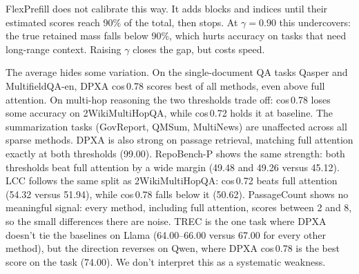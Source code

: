 FlexPrefill does not calibrate this way. It adds blocks and indices until their estimated scores reach 90\% of the total, then stops. At $\gamma{=}0.90$ this undercovers: the true retained mass falls below 90\%, which hurts accuracy on tasks that need long-range context. Raising $\gamma$ closes the gap, but costs speed.

The average hides some variation. On the single-document QA tasks Qasper and MultifieldQA-en, DPXA cos\,0.78 scores best of all methods, even above full attention. On multi-hop reasoning the two thresholds trade off: cos\,0.78 loses some accuracy on 2WikiMultiHopQA, while cos\,0.72 holds it at baseline. The summarization tasks (GovReport, QMSum, MultiNews) are unaffected across all sparse methods. DPXA is also strong on passage retrieval, matching full attention exactly at both thresholds (99.00). RepoBench-P shows the same strength: both thresholds beat full attention by a wide margin (49.48 and 49.26 versus 45.12). LCC follows the same split as 2WikiMultiHopQA: cos\,0.72 beats full attention (54.32 versus 51.94), while cos\,0.78 falls below it (50.62). PassageCount shows no meaningful signal: every method, including full attention, scores between 2 and 8, so the small differences there are noise. TREC is the one task where DPXA doesn't tie the baselines on Llama (64.00--66.00 versus 67.00 for every other method), but the direction reverses on Qwen, where DPXA cos\,0.78 is the best score on the task (74.00). We don't interpret this as a systematic weakness.


